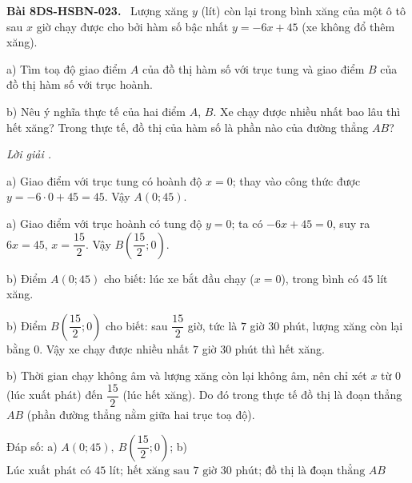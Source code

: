 \documentclass[12pt,a4paper]{article}
\newenvironment{problem}[1][]{\par\medskip\noindent\textbf{Bài #1.}\ }{\par}
\newenvironment{solution}[1][]{\par\noindent\textit{Lời giải #1.}\par}{\par}
\begin{document}
\begin{problem}[8DS-HSBN-023]
Lượng xăng $y$ (lít) còn lại trong bình xăng của một ô tô sau $x$ giờ chạy được cho bởi hàm số bậc nhất $y = -6x + 45$ (xe không đổ thêm xăng).

a) Tìm toạ độ giao điểm $A$ của đồ thị hàm số với trục tung và giao điểm $B$ của đồ thị hàm số với trục hoành.

b) Nêu ý nghĩa thực tế của hai điểm $A$, $B$. Xe chạy được nhiều nhất bao lâu thì hết xăng? Trong thực tế, đồ thị của hàm số là phần nào của đường thẳng $AB$?

\begin{solution}
a) Giao điểm với trục tung có hoành độ $x = 0$; thay vào công thức được $y = -6 \cdot 0 + 45 = 45$. Vậy $A(0; 45)$.

a) Giao điểm với trục hoành có tung độ $y = 0$; ta có $-6x + 45 = 0$, suy ra $6x = 45$, $x = \dfrac{15}{2}$. Vậy $B\left(\dfrac{15}{2}; 0\right)$.

b) Điểm $A(0; 45)$ cho biết: lúc xe bắt đầu chạy ($x = 0$), trong bình có $45$ lít xăng.

b) Điểm $B\left(\dfrac{15}{2}; 0\right)$ cho biết: sau $\dfrac{15}{2}$ giờ, tức là $7$ giờ $30$ phút, lượng xăng còn lại bằng $0$. Vậy xe chạy được nhiều nhất $7$ giờ $30$ phút thì hết xăng.

b) Thời gian chạy không âm và lượng xăng còn lại không âm, nên chỉ xét $x$ từ $0$ (lúc xuất phát) đến $\dfrac{15}{2}$ (lúc hết xăng). Do đó trong thực tế đồ thị là đoạn thẳng $AB$ (phần đường thẳng nằm giữa hai trục toạ độ).

Đáp số: a) $\boxed{A(0; 45),\ B\left(\dfrac{15}{2}; 0\right)}$; b) $\boxed{\text{Lúc xuất phát có } 45 \text{ lít; hết xăng sau } 7 \text{ giờ } 30 \text{ phút; đồ thị là đoạn thẳng } AB}$
\end{solution}
\end{problem}
\end{document}
